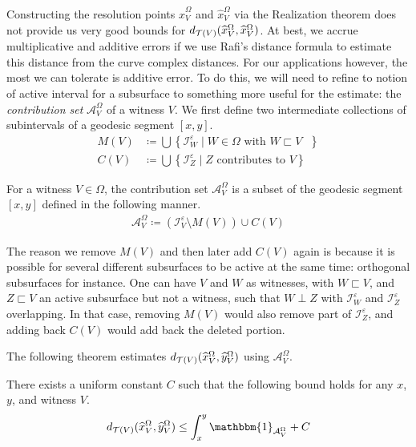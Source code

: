 \documentclass[12pt, reqno]{amsart}
\begin{document}
Constructing the resolution points $\widehat{x}_V^{\Omega}$ and $\widehat{x}_V^{\Omega}$ via the Realization theorem does not provide us very good bounds for $d_{\mathcal{T}(V)}(\widehat{x}_V^{\Omega}, \widehat{x}_V^{\Omega})$.
At best, we accrue multiplicative and additive errors if we use Rafi's distance formula to estimate this distance from the curve complex distances.
For our applications however, the most we can tolerate is additive error.
To do this, we will need to refine to notion of active interval for a subsurface to something more useful for the estimate: the \emph{contribution set} $\mathcal{A}_V^{\Omega}$ of a witness $V$.
We first define two intermediate collections of subintervals of a geodesic segment $[x,y]$.
\begin{align*}
  M(V) &\coloneqq \bigcup \left\{ \mathcal{I}_W^{\varepsilon} \mid \text{$W \in \Omega$ with $W \sqsubset V$ }  \right\} \\
  C(V) &\coloneqq \bigcup \left\{ \mathcal{I}_Z^{\varepsilon} \mid \text{$Z$ contributes to $V$} \right\}
\end{align*}

\begin{definition}
  For a witness $V \in \Omega$, the contribution set $\mathcal{A}_V^{\Omega}$ is a subset of the geodesic segment $[x,y]$ defined in the following manner.
  \begin{align*}
    \mathcal{A}_V^{\Omega} \coloneqq \left( \mathcal{I}_V^{\varepsilon} \setminus M(V) \right) \cup C(V)
  \end{align*}
\end{definition}
\begin{rem}
  The reason we remove $M(V)$ and then later add $C(V)$ again is because it is possible for several different subsurfaces to be active at the same time: orthogonal subsurfaces for instance.
  One can have $V$ and $W$ as witnesses, with $W \sqsubset V$, and $Z \sqsubset V$ an active subsurface but not a witness, such that $W \perp Z$ with $\mathcal{I}_W^{\varepsilon}$ and $\mathcal{I}_Z^{\varepsilon}$ overlapping.
  In that case, removing $M(V)$ would also remove part of $\mathcal{I}_Z^\varepsilon$, and adding back $C(V)$ would add back the deleted portion.
\end{rem}

The following theorem estimates $d_{\mathcal{T}(V)}(\widehat{x}_V^{\Omega}, \widehat{y}_V^{\Omega})$ using $\mathcal{A}_V^{\Omega}$.
\begin{theorem}
  \label{thm:contribution-set-resolution-distance}
  There exists a uniform constant $C$ such that the following bound holds for any $x$, $y$, and witness $V$.
  \begin{align*}
d_{\teich(V)}(\widehat{x}_V^{\Omega}, \widehat{y}_V^{\Omega}) \leq \int_x^y \mathbbm{1}_{\mathcal{A}_V^{\Omega}} + C
  \end{align*}
\end{theorem}
\end{document}
